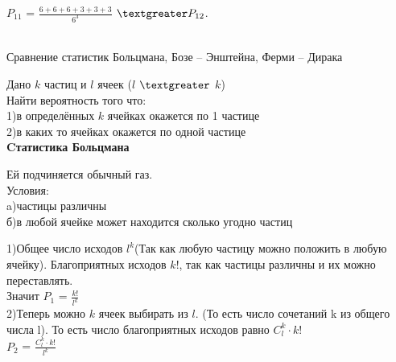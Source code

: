 \documentclass[russian, 12pt, fleqn]{article}
\begin{document}
$P_{11}$ = $\frac{6 +  6 + 6 + 3 + 3 + 3}{6^3}$  $\textgreater P_{12}$.\\
\\
\begin{center}
$\textbf{Сравнение статистик Больцмана, Бозе -- Энштейна, Ферми -- Дирака }$
\end{center}
Дано $k$ частиц и $l$ ячеек ($l$ $\textgreater$ $k$)\\
Найти вероятность того что:\\
	1)в определённых $k$ ячейках окажется по 1 частице\\
	2)в каких то ячейках окажется по одной частице\\
\textbf{Cтатистика Больцмана}
\begin{tabbing}
Ей подчиняется обычный газ.\\
Условия:\\
\qquad a)частицы различны\\
\qquad б)в любой ячейке может находится сколько угодно частиц\\
\end{tabbing}
1)Общее число исходов $l^k$(Так как любую частицу можно положить в любую ячейку). Благоприятных исходов $k!$, так как частицы различны и их можно переставлять.\\
Значит $P_1$ = $\frac{k!}{l^k}$\\
2)Теперь можно $k$ ячеек выбирать из $l$. (То есть число сочетаний k из общего числа l). То есть число благоприятных исходов равно $C^k_l \cdot k!$\\
$P_2$ = $\frac{C_l^k\cdot k!}{l^k}$\\
\end{document}
